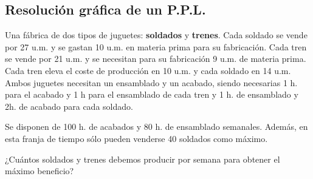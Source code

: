 \newpage
\subsection{Resolución gráfica de un P.P.L.}

\begin{ejemplo}\label{ej2.2}
  Una fábrica de dos tipos de juguetes: \textbf{soldados} y \textbf{trenes}. Cada soldado se vende por 27 u.m. y se gastan 10 u.m. en materia prima para su fabricación. Cada tren se vende por 21 u.m. y se necesitan para su fabricación 9 u.m. de materia prima. Cada tren eleva el coste de producción en 10 u.m. y cada soldado en 14 u.m. Ambos juguetes necesitan un ensamblado y un acabado, siendo necesarias 1 h. para el acabado y 1 h para el ensamblado de cada tren y 1 h. de ensamblado y 2h. de acabado para cada soldado.\vspace*{0.3cm}
  
  Se disponen de 100 h. de acabados y 80 h. de ensamblado semanales. Además, en esta franja de tiempo sólo pueden venderse 40 soldados como máximo.\vspace*{0.3cm}
  
  ¿Cuántos soldados y trenes debemos producir por semana para obtener el máximo beneficio?
\end{ejemplo}

